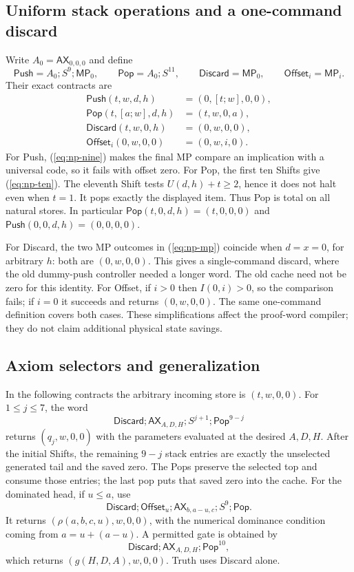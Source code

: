 \subsection{Uniform stack operations and a one-command discard}

Write $A_0=\mathsf{AX}_{0,0,0}$ and define
\[
 \mathsf{Push}=A_0;S^9;\mathsf{MP}_0,\qquad
 \mathsf{Pop}=A_0;S^{11},\qquad
 \mathsf{Discard}=\mathsf{MP}_0,\qquad
 \mathsf{Offset}_i=\mathsf{MP}_i.
\]
Their exact contracts are
\begin{align}
 \mathsf{Push}(t,w,d,h)&=(0,[t;w],0,0),\label{eq:np-push}\\
 \mathsf{Pop}(t,[a;w],d,h)&=(t,w,0,a),\label{eq:np-pop}\\
 \mathsf{Discard}(t,w,0,h)&=(0,w,0,0),\label{eq:np-discard}\\
 \mathsf{Offset}_i(0,w,0,0)&=(0,w,i,0).\label{eq:np-offset}
\end{align}
For Push, (\ref{eq:np-nine}) makes the final MP compare an implication
with a universal code, so it fails with offset zero. For Pop, the first
ten Shifts give (\ref{eq:np-ten}). The eleventh Shift tests
$U(d,h)+t\ge2$, hence it does not halt even when $t=1$.
It pops exactly the displayed item. Thus Pop is total on all natural
stores. In particular $\mathsf{Pop}(t,0,d,h)=(t,0,0,0)$ and
$\mathsf{Push}(0,0,d,h)=(0,0,0,0)$.

For Discard, the two MP outcomes in (\ref{eq:np-mp}) coincide when
$d=x=0$, for arbitrary $h$: both are $(0,w,0,0)$. This gives a single-command discard,
where the old dummy-push controller needed a longer word. The old cache
need not be zero for this identity. For Offset,
if $i>0$ then $I(0,i)>0$, so the comparison fails; if $i=0$ it succeeds
and returns $(0,w,0,0)$. The same one-command definition covers both cases.
These simplifications affect the proof-word compiler; they do not claim
additional physical state savings.

\subsection{Axiom selectors and generalization}

In the following contracts the arbitrary incoming store is $(t,w,0,0)$.
For $1\le j\le7$, the word
\[
 \mathsf{Discard};\mathsf{AX}_{A,D,H};S^{j+1};\mathsf{Pop}^{9-j}
\]
returns $(q_j,w,0,0)$ with the parameters evaluated at the desired
$A,D,H$. After the initial Shifts, the remaining $9-j$ stack entries
are exactly the unselected generated tail and the saved zero. The Pops
preserve the selected top and consume those entries; the last pop puts
that saved zero into the cache. For the dominated head, if $u\le a$,
use
\[
 \mathsf{Discard};\mathsf{Offset}_u;
 \mathsf{AX}_{b,a-u,c};S^9;\mathsf{Pop}.
\]
It returns $(\rho(a,b,c,u),w,0,0)$, with the numerical dominance condition
coming from $a=u+(a-u)$. A permitted gate is obtained by
\[
 \mathsf{Discard};\mathsf{AX}_{A,D,H};\mathsf{Pop}^{10},
\]
which returns $(g(H,D,A),w,0,0)$. Truth uses Discard alone.

